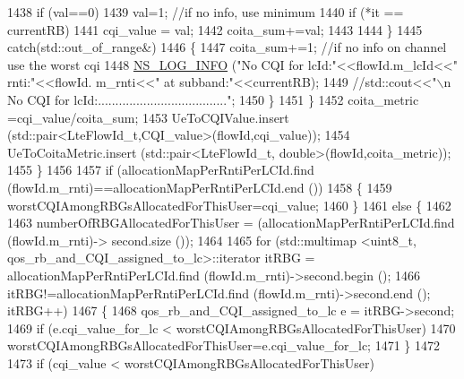 \begin{DoxyCode}
1438                           \textcolor{keywordflow}{if} (val==0)
1439                             val=1;                                             \textcolor{comment}{//if no info, use minimum}
1440                           \textcolor{keywordflow}{if} (*it == currentRB)
1441                             cqi\_value = val;
1442                           coita\_sum+=val;
1443 
1444                         \}
1445                       \textcolor{keywordflow}{catch}(std::out\_of\_range&)
1446                         \{
1447                           coita\_sum+=1;                                      \textcolor{comment}{//if no info on channel use
       the worst cqi}
1448                           \hyperlink{group__logging_gafbd73ee2cf9f26b319f49086d8e860fb}{NS\_LOG\_INFO} (\textcolor{stringliteral}{"No CQI for lcId:"}<<flowId.m\_lcId<<\textcolor{stringliteral}{" rnti:"}<<flowId.
      m\_rnti<<\textcolor{stringliteral}{" at subband:"}<<currentRB);
1449                           \textcolor{comment}{//std::cout<<"\(\backslash\)n No CQI for lcId:.....................................";}
1450                         \}
1451                     \}
1452                   coita\_metric =cqi\_value/coita\_sum;
1453                   UeToCQIValue.insert (std::pair<LteFlowId\_t,CQI\_value>(flowId,cqi\_value));
1454                   UeToCoitaMetric.insert (std::pair<LteFlowId\_t, double>(flowId,coita\_metric));
1455                 \}
1456 
1457               \textcolor{keywordflow}{if} (allocationMapPerRntiPerLCId.find (flowId.m\_rnti)==allocationMapPerRntiPerLCId.end ())
1458                 \{
1459                   worstCQIAmongRBGsAllocatedForThisUser=cqi\_value;
1460                 \}
1461               \textcolor{keywordflow}{else} \{
1462 
1463                   numberOfRBGAllocatedForThisUser = (allocationMapPerRntiPerLCId.find (flowId.m\_rnti)->
      second.size ());
1464 
1465                   \textcolor{keywordflow}{for} (std::multimap <uint8\_t, qos\_rb\_and\_CQI\_assigned\_to\_lc>::iterator itRBG = 
      allocationMapPerRntiPerLCId.find (flowId.m\_rnti)->second.begin ();
1466                        itRBG!=allocationMapPerRntiPerLCId.find (flowId.m\_rnti)->second.end (); itRBG++)
1467                     \{
1468                       qos\_rb\_and\_CQI\_assigned\_to\_lc e = itRBG->second;
1469                       \textcolor{keywordflow}{if} (e.cqi\_value\_for\_lc < worstCQIAmongRBGsAllocatedForThisUser)
1470                         worstCQIAmongRBGsAllocatedForThisUser=e.cqi\_value\_for\_lc;
1471                     \}
1472 
1473                   \textcolor{keywordflow}{if} (cqi\_value < worstCQIAmongRBGsAllocatedForThisUser)

\end{DoxyCode}

